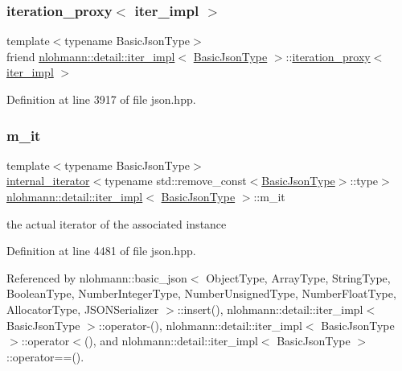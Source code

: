 \subsubsection{\texorpdfstring{iteration\+\_\+proxy$<$ iter\+\_\+impl $>$}{iteration\_proxy< iter\_impl >}}
{\footnotesize\ttfamily template$<$typename Basic\+Json\+Type$>$ \\
friend \hyperlink{classnlohmann_1_1detail_1_1iter__impl}{nlohmann\+::detail\+::iter\+\_\+impl}$<$ \hyperlink{classnlohmann_1_1detail_1_1iter__impl_abf18f18793f84b0222aebb5a2a87da7a}{Basic\+Json\+Type} $>$\+::\hyperlink{classnlohmann_1_1detail_1_1iteration__proxy}{iteration\+\_\+proxy}$<$ \hyperlink{classnlohmann_1_1detail_1_1iter__impl}{iter\+\_\+impl} $>$\hspace{0.3cm}{\ttfamily [private]}}



Definition at line 3917 of file json.\+hpp.

\mbox{\label{classnlohmann_1_1detail_1_1iter__impl_a8a86a7c0d4af0cc4ab345b6f0e13cdfa}} 
\subsubsection{\texorpdfstring{m\+\_\+it}{m\_it}}
{\footnotesize\ttfamily template$<$typename Basic\+Json\+Type$>$ \\
\hyperlink{structnlohmann_1_1detail_1_1internal__iterator}{internal\+\_\+iterator}$<$typename std\+::remove\+\_\+const$<$\hyperlink{classnlohmann_1_1detail_1_1iter__impl_abf18f18793f84b0222aebb5a2a87da7a}{Basic\+Json\+Type}$>$\+::type$>$ \hyperlink{classnlohmann_1_1detail_1_1iter__impl}{nlohmann\+::detail\+::iter\+\_\+impl}$<$ \hyperlink{classnlohmann_1_1detail_1_1iter__impl_abf18f18793f84b0222aebb5a2a87da7a}{Basic\+Json\+Type} $>$\+::m\+\_\+it\hspace{0.3cm}{\ttfamily [private]}}



the actual iterator of the associated instance 



Definition at line 4481 of file json.\+hpp.



Referenced by nlohmann\+::basic\+\_\+json$<$ Object\+Type, Array\+Type, String\+Type, Boolean\+Type, Number\+Integer\+Type, Number\+Unsigned\+Type, Number\+Float\+Type, Allocator\+Type, J\+S\+O\+N\+Serializer $>$\+::insert(), nlohmann\+::detail\+::iter\+\_\+impl$<$ Basic\+Json\+Type $>$\+::operator-\/(), nlohmann\+::detail\+::iter\+\_\+impl$<$ Basic\+Json\+Type $>$\+::operator$<$(), and nlohmann\+::detail\+::iter\+\_\+impl$<$ Basic\+Json\+Type $>$\+::operator==().

